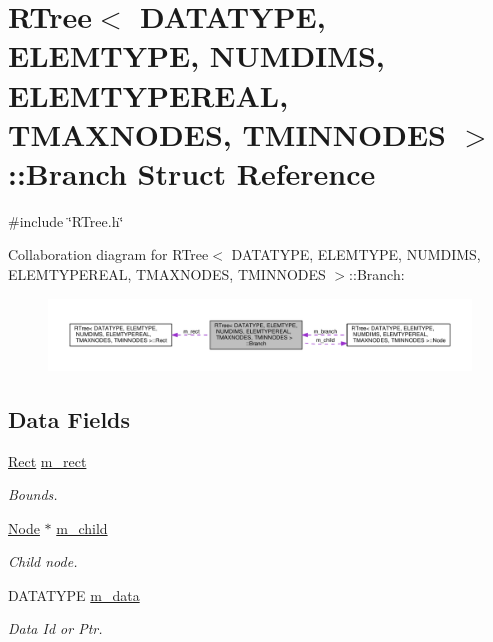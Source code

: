 \hypertarget{structRTree_1_1Branch}{\section{R\-Tree$<$ D\-A\-T\-A\-T\-Y\-P\-E, E\-L\-E\-M\-T\-Y\-P\-E, N\-U\-M\-D\-I\-M\-S, E\-L\-E\-M\-T\-Y\-P\-E\-R\-E\-A\-L, T\-M\-A\-X\-N\-O\-D\-E\-S, T\-M\-I\-N\-N\-O\-D\-E\-S $>$\-:\-:Branch Struct Reference}
\label{structRTree_1_1Branch}
}


{\ttfamily \#include \char`\"{}R\-Tree.\-h\char`\"{}}



Collaboration diagram for R\-Tree$<$ D\-A\-T\-A\-T\-Y\-P\-E, E\-L\-E\-M\-T\-Y\-P\-E, N\-U\-M\-D\-I\-M\-S, E\-L\-E\-M\-T\-Y\-P\-E\-R\-E\-A\-L, T\-M\-A\-X\-N\-O\-D\-E\-S, T\-M\-I\-N\-N\-O\-D\-E\-S $>$\-:\-:Branch\-:\nopagebreak
\begin{figure}[H]
\begin{center}
\leavevmode
\includegraphics[width=350pt]{structRTree_1_1Branch__coll__graph}
\end{center}
\end{figure}
\subsection*{Data Fields}
\begin{DoxyCompactItemize}
\item 
\hyperlink{structRTree_1_1Rect}{Rect} \hyperlink{structRTree_1_1Branch_a7e98e0d7fb6afd18ec243450b22d9abe}{m\-\_\-rect}
\begin{DoxyCompactList}\small\item\em Bounds. \end{DoxyCompactList}\item 
\hyperlink{structRTree_1_1Node}{Node} $\ast$ \hyperlink{structRTree_1_1Branch_aa15f22000d06c726372eb84f46db0fa0}{m\-\_\-child}
\begin{DoxyCompactList}\small\item\em Child node. \end{DoxyCompactList}\item 
D\-A\-T\-A\-T\-Y\-P\-E \hyperlink{structRTree_1_1Branch_afc1aee31a1a62ad4e800a536a3a9d665}{m\-\_\-data}
\begin{DoxyCompactList}\small\item\em Data Id or Ptr. \end{DoxyCompactList}\end{DoxyCompactItemize}


